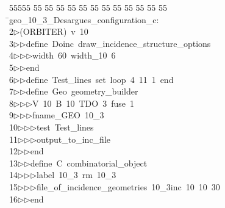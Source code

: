%
%
\begin{tabbing}
55555 \= 55 \= 55 \= 55 \= 55 \= 55 \= 55 \= 55 \= 55 \= 55 \= 55 \= 55 \= 55 \= \>geo\_10\_3\_Desargues\_configuration\_c:\\[0pt]
2\>$\triangleright$\>(ORBITER)\ v\ 10\ \\[0pt]
3\>$\triangleright$\>$\triangleright$\>define\ Doinc\ draw\_incidence\_structure\_options\ \\[0pt]
4\>$\triangleright$\>$\triangleright$\>$\triangleright$\>width\ 60\ width\_10\ 6\ \\[0pt]
5\>$\triangleright$\>$\triangleright$\>end\ \\[0pt]
6\>$\triangleright$\>$\triangleright$\>define\ Test\_lines\ set\ loop\ 4\ 11\ 1\ end\ \\[0pt]
7\>$\triangleright$\>$\triangleright$\>define\ Geo\ geometry\_builder\ \\[0pt]
8\>$\triangleright$\>$\triangleright$\>$\triangleright$\>V\ 10\ B\ 10\ TDO\ 3\ fuse\ 1\ \\[0pt]
9\>$\triangleright$\>$\triangleright$\>$\triangleright$\>fname\_GEO\ 10\_3\ \\[0pt]
10\>$\triangleright$\>$\triangleright$\>$\triangleright$\>test\ Test\_lines\ \\[0pt]
11\>$\triangleright$\>$\triangleright$\>$\triangleright$\>output\_to\_inc\_file\ \\[0pt]
12\>$\triangleright$\>$\triangleright$\>end\ \\[0pt]
13\>$\triangleright$\>$\triangleright$\>define\ C\ combinatorial\_object\ \\[0pt]
14\>$\triangleright$\>$\triangleright$\>$\triangleright$\>label\ 10\_3\ rm\ 10\_3\ \\[0pt]
15\>$\triangleright$\>$\triangleright$\>$\triangleright$\>file\_of\_incidence\_geometries\ 10\_3inc\ 10\ 10\ 30\ \\[0pt]
16\>$\triangleright$\>$\triangleright$\>end\ \\[0pt]

\end{tabbing}
